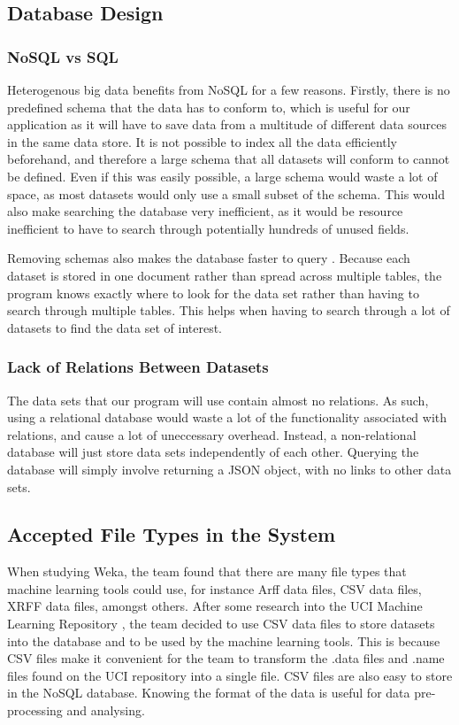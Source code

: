 \documentclass[titlepage]{article}
\begin{document}
\subsection{Database Design\label{dbdesign}}
\subsubsection{NoSQL vs SQL}
Heterogenous big data benefits from NoSQL for a few reasons. Firstly, there is no predefined schema that the data has to conform to, which is useful for our application as it will have to save data from a multitude of different data sources in the same data store. It is not possible to index all the data efficiently beforehand, and therefore a large schema that all datasets will conform to cannot be defined. Even if this was easily possible, a large schema would waste a lot of space, as most datasets would only use a small subset of the schema. This would also make searching the database very inefficient, as it would be resource inefficient to have to search through potentially hundreds of unused fields.

Removing schemas also makes the database faster to query \cite{sqlvsnosql}. Because each dataset is stored in one document rather than spread across multiple tables, the program knows exactly where to look for the data set rather than having to search through multiple tables. This helps when having to search through a lot of datasets to find the data set of interest.

\subsubsection{Lack of Relations Between Datasets}
The data sets that our program will use contain almost no relations. As such, using a relational database would waste a lot of the functionality associated with relations, and cause a lot of uneccessary overhead. Instead, a non-relational database will just store data sets independently of each other. Querying the database will simply involve returning a JSON object, with no links to other data sets.

\subsection{Accepted File Types in the System}

When studying Weka, the team found that there are many file types that machine learning tools could use, for instance Arff data files, CSV data files, XRFF data files, amongst others. After some research into the UCI Machine Learning Repository \cite{uci}, the team decided to use CSV data files to store datasets into the database and to be used by the machine learning tools. This is because CSV files make it convenient for the team to transform the .data files and .name files found on the UCI repository into a single file. CSV files are also easy to store in the NoSQL database. Knowing the format of the data is useful for data pre-processing and analysing.
\end{document}
